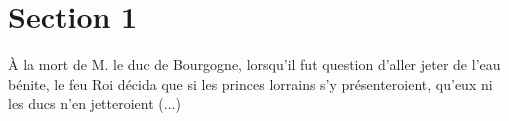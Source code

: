 \documentclass{article}
\begin{document}
\section{Section 1}

\`A la mort de M. le \gls{duc} de Bourgogne, lorsqu'il fut question d'aller jeter de l'eau b\'enite, le feu Roi d\'ecida que si les princes lorrains s'y pr\'esenteroient, qu'eux ni les \gls{ducs} n'en jetteroient (...)

\cite{Ref1}




\printindex

\printglossaries
\end{document}
